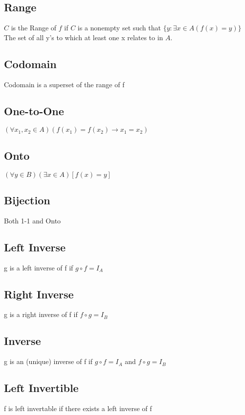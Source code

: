 \documentclass{article}
\begin{document}
\subsection*{Range}
$C$ is the Range of $f$ if $C$ is a nonempty set such that $\{y: \exists x \in A (f(x) = y)\}$ \\
The set of all y's to which at least one x relates to in $A$.

\subsection*{Codomain}
Codomain is a superset of the range of f

\subsection*{One-to-One}
$(\forall x_1, x_2 \in A)(f(x_1) = f(x_2) \rightarrow x_1 = x_2)$

\subsection*{Onto}
$(\forall y \in B)(\exists x \in A)[f(x) = y]$

\subsection*{Bijection}
Both 1-1 and Onto

\subsection*{Left Inverse}
g is a left inverse of f if $g \circ f = I_A$


\subsection*{Right Inverse}
g is a right inverse of f if $f \circ g = I_B$

\subsection*{Inverse}
g is an (unique) inverse of f if $g \circ f = I_A$ and $f \circ g = I_B$

\subsection*{Left Invertible}
f is left invertable if there exists a left inverse of f
\end{document}
